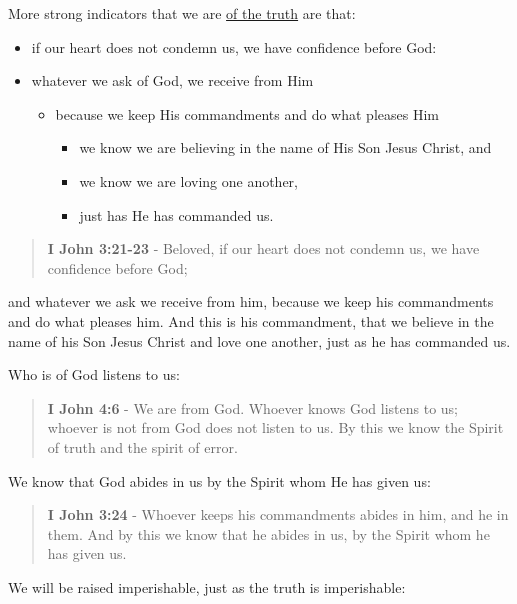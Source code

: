 \documentclass[11pt]{article}
\begin{document}
More strong indicators that we are \uline{of the truth} are that:
\begin{itemize}
\item if our heart does not condemn us, we  have confidence before God:
\item whatever we ask of God, we receive from Him
\begin{itemize}
\item because we keep His commandments and do what pleases Him
\begin{itemize}
\item we know we are believing in the name of His Son Jesus Christ, and
\item we know we are loving one another,
\item just has He has commanded us.
\end{itemize}
\end{itemize}
\end{itemize}

\begin{quote}
\textbf{I John 3:21-23} - Beloved, if our heart does not condemn us, we have confidence before God;
\end{quote}
and whatever we ask we receive from him, because we keep his commandments and do what pleases him. And this is his commandment, that we believe in the name of his Son Jesus Christ and love one another, just as he has commanded us.

Who is of God listens to us:

\begin{quote}
\textbf{I John 4:6} - We are from God. Whoever knows God listens to us; whoever is not from God does not listen to us. By this we know the Spirit of truth and the spirit of error.
\end{quote}

We know that God abides in us by the Spirit whom He has given us:

\begin{quote}
\textbf{I John 3:24} - Whoever keeps his commandments abides in him, and he in them. And by this we know that he abides in us, by the Spirit whom he has given us.
\end{quote}

We will be raised imperishable, just as the truth is imperishable:
\end{document}
